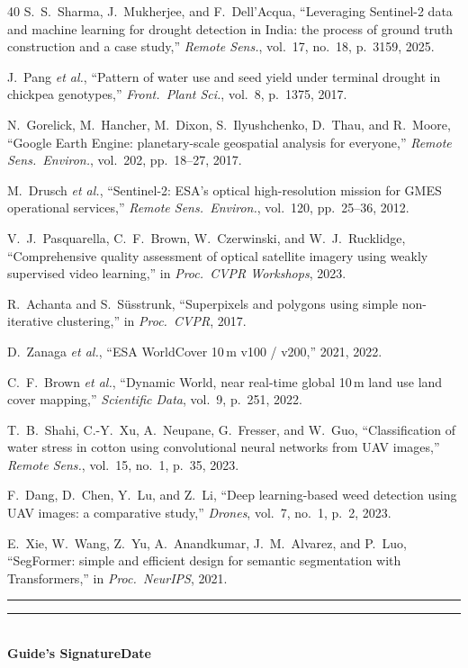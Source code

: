 \documentclass[11pt,a4paper,oneside]{article}
\begin{document}
\begin{thebibliography}{40}
 S.~S.~Sharma, J.~Mukherjee, and F.~Dell'Acqua, ``Leveraging Sentinel-2 data and machine learning for drought detection in India: the process of ground truth construction and a case study,'' \textit{Remote Sens.}, vol.~17, no.~18, p.~3159, 2025.

 J.~Pang \textit{et al.}, ``Pattern of water use and seed yield under terminal drought in chickpea genotypes,'' \textit{Front.\ Plant Sci.}, vol.~8, p.~1375, 2017.

 N.~Gorelick, M.~Hancher, M.~Dixon, S.~Ilyushchenko, D.~Thau, and R.~Moore, ``Google Earth Engine: planetary-scale geospatial analysis for everyone,'' \textit{Remote Sens.\ Environ.}, vol.~202, pp.~18--27, 2017.

 M.~Drusch \textit{et al.}, ``Sentinel-2: ESA's optical high-resolution mission for GMES operational services,'' \textit{Remote Sens.\ Environ.}, vol.~120, pp.~25--36, 2012.

 V.~J.~Pasquarella, C.~F.~Brown, W.~Czerwinski, and W.~J.~Rucklidge, ``Comprehensive quality assessment of optical satellite imagery using weakly supervised video learning,'' in \textit{Proc.\ CVPR Workshops}, 2023.

 R.~Achanta and S.~S\"{u}sstrunk, ``Superpixels and polygons using simple non-iterative clustering,'' in \textit{Proc.\ CVPR}, 2017.

 D.~Zanaga \textit{et al.}, ``ESA WorldCover 10\,m v100 / v200,'' 2021, 2022.

 C.~F.~Brown \textit{et al.}, ``Dynamic World, near real-time global 10\,m land use land cover mapping,'' \textit{Scientific Data}, vol.~9, p.~251, 2022.

 T.~B.~Shahi, C.-Y.~Xu, A.~Neupane, G.~Fresser, and W.~Guo, ``Classification of water stress in cotton using convolutional neural networks from UAV images,'' \textit{Remote Sens.}, vol.~15, no.~1, p.~35, 2023.

 F.~Dang, D.~Chen, Y.~Lu, and Z.~Li, ``Deep learning-based weed detection using UAV images: a comparative study,'' \textit{Drones}, vol.~7, no.~1, p.~2, 2023.

 E.~Xie, W.~Wang, Z.~Yu, A.~Anandkumar, J.~M.~Alvarez, and P.~Luo, ``SegFormer: simple and efficient design for semantic segmentation with Transformers,'' in \textit{Proc.\ NeurIPS}, 2021.

\end{thebibliography}
\endgroup

\vspace{6pt}
\noindent\rule{0.38\textwidth}{0.4pt}\hfill\rule{0.28\textwidth}{0.4pt}\\[2pt]
\noindent\textbf{Guide's Signature}\hfill\textbf{Date}
\end{document}

